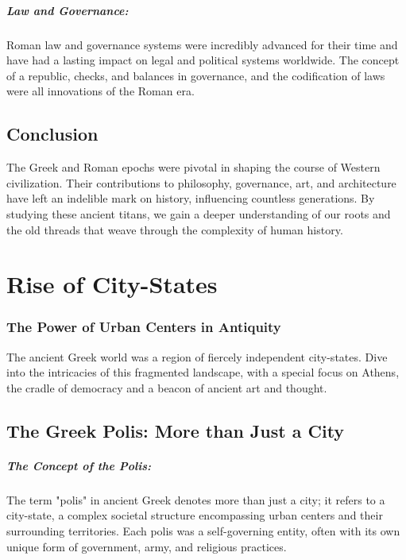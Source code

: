 \documentclass[a4paper,12pt]{book}
\begin{document}
\paragraph{Law and Governance:}
Roman law and governance systems were incredibly advanced for their time and have had a lasting impact on legal and political systems worldwide. The concept of a republic, checks, and balances in governance, and the codification of laws were all innovations of the Roman era.

\section*{Conclusion}

The Greek and Roman epochs were pivotal in shaping the course of Western civilization. Their contributions to philosophy, governance, art, and architecture have left an indelible mark on history, influencing countless generations. By studying these ancient titans, we gain a deeper understanding of our roots and the old threads that weave through the complexity of human history.

\chapter{Rise of City-States}
\subsection*{The Power of Urban Centers in Antiquity}
The ancient Greek world was a region of fiercely independent city-states. Dive into the intricacies of this fragmented landscape, with a special focus on Athens, the cradle of democracy and a beacon of ancient art and thought.

\section*{The Greek Polis: More than Just a City}

\paragraph{The Concept of the Polis:}
The term "polis" in ancient Greek denotes more than just a city; it refers to a city-state, a complex societal structure encompassing urban centers and their surrounding territories. Each polis was a self-governing entity, often with its own unique form of government, army, and religious practices.
\end{document}
